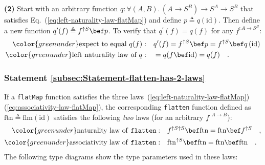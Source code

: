 \textbf{(2)} Start with an arbitrary function $q:\forall(A,B).\,(A\rightarrow S^{B})\rightarrow S^{A}\rightarrow S^{B}$
that satisfies Eq.~(\ref{eq:left-naturality-law-flatMap}) and define
$p\triangleq q\left(\text{id}\right)$. Then define a new function
$q^{\prime}(f)\triangleq f^{\uparrow S}\bef p$. To verify that $q^{\prime}(f)=q(f)$
for any $f^{:A\rightarrow S^{B}}$:
\begin{align*}
{\color{greenunder}\text{expect to equal }q(f):}\quad & q^{\prime}(f)=f^{\uparrow S}\bef p=f^{\uparrow S}\bef q\left(\text{id}\right)\\
{\color{greenunder}\text{left naturality law of }q:}\quad & =q(f\bef\text{id})=q(f)\quad.
\end{align*}


\subsubsection{Statement \label{subsec:Statement-flatten-has-2-laws}\ref{subsec:Statement-flatten-has-2-laws}}

If a \lstinline!flatMap! function satisfies the three laws~(\ref{eq:left-naturality-law-flatMap})\textendash (\ref{eq:associativity-law-flatMap}),
the corresponding \lstinline!flatten! function
defined as $\text{ftn}\triangleq\text{flm}\left(\text{id}\right)$
satisfies the following \emph{two} laws (for an arbitrary $f^{:A\rightarrow B}$):
\begin{align}
{\color{greenunder}\text{naturality law of \texttt{flatten}}:}\quad & f^{\uparrow S\uparrow S}\bef\text{ftn}=\text{ftn}\bef f^{\uparrow S}\quad,\label{eq:naturality-law-of-flatten}\\
{\color{greenunder}\text{associativity law of \texttt{flatten}}:}\quad & \text{ftn}^{\uparrow S}\bef\text{ftn}=\text{ftn}\bef\text{ftn}\quad.\label{eq:associativity-law-of-flatten}
\end{align}
The following type diagrams show the type parameters used in these
laws:


